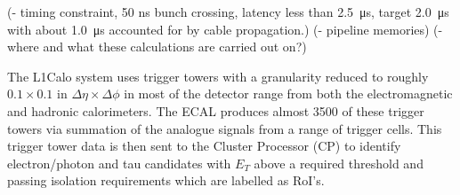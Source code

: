 	(- timing constraint, 50 ns bunch crossing, latency less than \SI{2.5}{\us}, target \SI{2.0}{\us} with about \SI{1.0}{\us} accounted for by cable propagation.)
	(- pipeline memories)
	(- where and what these calculations are carried out on?)

	The L1Calo system uses trigger towers with a granularity reduced to roughly $0.1 \times 0.1$ in $\Delta\eta \times \Delta\phi$ in most of the detector range from both the electromagnetic and hadronic calorimeters. The ECAL produces almost 3500 of these trigger towers via summation of the analogue signals from a range of trigger cells. This trigger tower data is then sent to the Cluster Processor (CP) to identify electron/photon and tau candidates with $E_{T}$ above a required threshold and passing isolation requirements which are labelled as RoI's.

